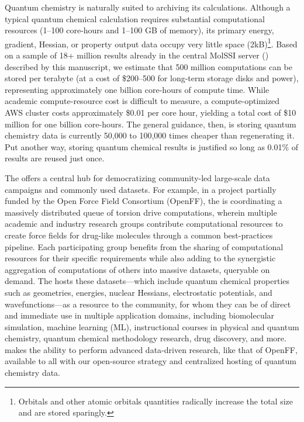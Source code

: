 \documentclass[journal=jctcce,manuscript=article]{achemso}
\newcommand{\textapprox}{\raisebox{0.5ex}{\texttildelow}}
\newcommand{\qcaN}{QCArchive}
\newcommand{\qca}{{\sc{\qcaN}}\xspace}%
\newcommand{\mqcas}{{\sc{mqcas}}\xspace}%
\begin{document}
Quantum chemistry is naturally suited to archiving its calculations.
Although a typical quantum chemical calculation requires substantial computational resources (\textapprox1--100 core-hours and \textapprox1--100 GB of memory), its primary energy, gradient, Hessian, or property output data occupy very little space (\textapprox2kB)\footnote{Orbitals and other atomic orbitals quantities radically increase the total size and are stored sparingly.}.
Based on a sample of 18+ million results already in the central MolSSI \qca server (\mqcas) described by this manuscript, we estimate that 500 million computations can be stored per terabyte (at a cost of \textapprox\$200--500 for long-term storage disks and power), representing approximately one billion core-hours of compute time.
While academic compute-resource cost is difficult to measure, a compute-optimized AWS cluster costs approximately \$0.01 per core hour, yielding a total cost of \textapprox\$10 million for one billion core-hours. 
The general guidance, then, is storing quantum chemistry data is currently 50,000 to 100,000 times cheaper than regenerating it.
Put another way, storing quantum chemical results is justified so long as 0.01\% of results are reused just once.

The \mqcas offers a central hub for democratizing community-led large-scale data campaigns and commonly used datasets. 
For example, in a project partially funded by the Open Force Field Consortium (OpenFF),\cite{MobleyOpenFF} the \mqcas is coordinating a massively distributed queue of torsion drive computations, wherein multiple academic and industry research groups contribute computational resources to create force fields for drug-like molecules through a common best-practices pipeline. 
Each participating group benefits from the sharing of computational resources for their specific requirements while also adding to the synergistic aggregation of computations of others into massive datasets, queryable on demand. 
The \mqcas hosts these datasets---which include quantum chemical properties such as geometries, energies, nuclear Hessians, electrostatic potentials, and wavefunctions---as a resource to the community, for whom they can be of direct and immediate use in multiple application domains, including biomolecular simulation, machine learning (ML), instructional courses in physical and quantum chemistry, quantum chemical methodology research, drug discovery, and more. 
\qca makes the ability to perform advanced data-driven research, like that of OpenFF, available to all with our open-source strategy and centralized hosting of quantum chemistry data.
\end{document}
